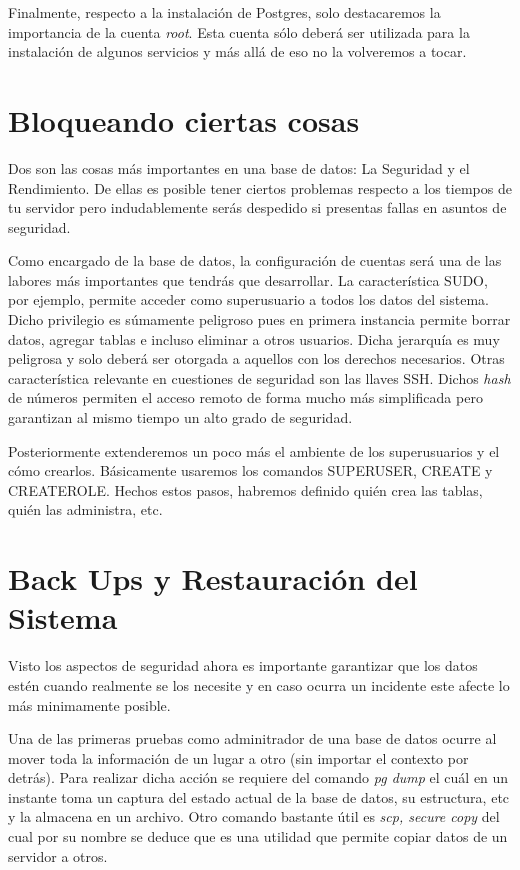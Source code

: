 \documentclass[12pt,conference]{IEEEtran}
\begin{document}
Finalmente, respecto a la instalación de Postgres, solo destacaremos la importancia de la cuenta  \textit{root}. Esta cuenta sólo deberá ser utilizada para la instalación de algunos servicios  y más allá de eso no la volveremos a tocar.

\section{Bloqueando ciertas cosas}

Dos son las cosas más importantes en una base de datos: La Seguridad y el Rendimiento. De ellas es posible tener ciertos problemas respecto a los tiempos de tu servidor pero indudablemente serás despedido si presentas fallas en asuntos de seguridad.

Como encargado de la base de datos, la configuración de cuentas será una de las labores más importantes que tendrás que desarrollar. La característica SUDO, por ejemplo, permite acceder como superusuario  a todos los datos del sistema. Dicho privilegio es súmamente peligroso pues en primera instancia permite borrar datos, agregar tablas e incluso eliminar a otros usuarios. Dicha jerarquía es muy peligrosa y solo deberá ser otorgada a aquellos con los derechos necesarios. Otras característica relevante en cuestiones de seguridad son las llaves SSH. Dichos \textit{hash} de números permiten el acceso remoto de forma mucho más simplificada pero garantizan al mismo tiempo un alto grado de seguridad.

Posteriormente extenderemos un poco más el ambiente de los superusuarios y el cómo crearlos. Básicamente usaremos los comandos SUPERUSER, CREATE y CREATEROLE. Hechos estos pasos, habremos definido quién crea las tablas, quién las administra, etc.


\section{Back Ups y Restauración del Sistema}

Visto los aspectos de seguridad ahora es importante garantizar que los datos estén cuando realmente se los necesite y en caso ocurra un incidente este afecte lo más minimamente posible. 

Una de las primeras pruebas como adminitrador de una base de datos ocurre al mover toda la información de un lugar a otro (sin importar el contexto por detrás). Para realizar dicha acción se requiere del comando \textit{pg dump} el cuál en un instante toma un captura del estado actual de la base de datos, su estructura, etc y la almacena en un archivo. Otro comando bastante útil es \textit{scp, secure copy}  del cual por su nombre se deduce que es una utilidad que permite copiar datos de un servidor a otros.
\end{document}
